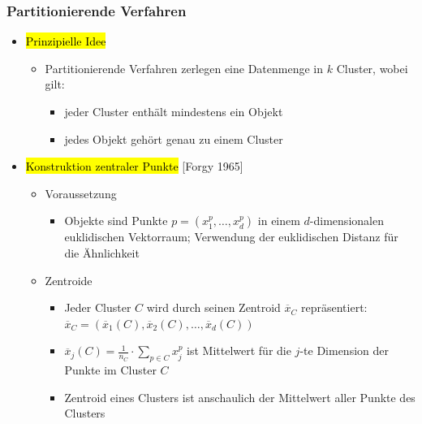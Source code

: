 \begin{frame}%
\frametitle{Partitionierende Verfahren}

\begin{itemize}
\item \hl{Prinzipielle Idee}
\begin{itemize}
\item Partitionierende Verfahren zerlegen eine Datenmenge in $k$
  Cluster, wobei gilt:  
\begin{itemize}
\item jeder Cluster enthält mindestens ein Objekt 
\item jedes Objekt gehört genau zu einem Cluster 
\end{itemize}
\end{itemize}
\item \hl{Konstruktion zentraler Punkte} [Forgy 1965] 
\begin{itemize}
\item Voraussetzung 
\begin{itemize}
\item Objekte sind Punkte $p=(x^p_1, \dots, x^p_d)$ in einem
  $d$-dimensionalen euklidischen Vektorraum; Verwendung der
  euklidischen Distanz für die Ähnlichkeit  
\end{itemize}
\item Zentroide 
\begin{itemize}
\item Jeder Cluster $C$ wird durch seinen Zentroid $\overline{x}_C$
  repräsentiert: $\overline{x}_C=(\overline{x}_1(C),
  \overline{x}_2(C), \dots, \overline{x}_d(C))$ 
\item $\overline{x}_j(C)=\frac{1}{n_C}\cdot\sum_{p\in C}x^p_j$ ist
  Mittelwert für die $j$-te Dimension der Punkte im Cluster $C$  
\item Zentroid eines Clusters ist anschaulich der Mittelwert aller
  Punkte des Clusters  
\end{itemize}
\end{itemize}
\end{itemize}

\end{frame}


